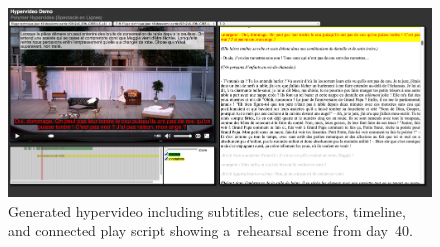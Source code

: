 \documentclass[conference]{IEEEtran}
\newcommand{\todo}[1]{\noindent\textcolor{red}{{\bf \{ToDo} #1{\bf \}}}}
\begin{document}
\begin{figure}[htb!]
  \centering
  \includegraphics[width=0.95\linewidth]{screenshot}
  \caption{Generated hypervideo including subtitles, cue selectors, timeline, and connected play script
    showing a~rehearsal scene from day~40.}
  \label{fig:screenshot}
\end{figure}





\end{document}
